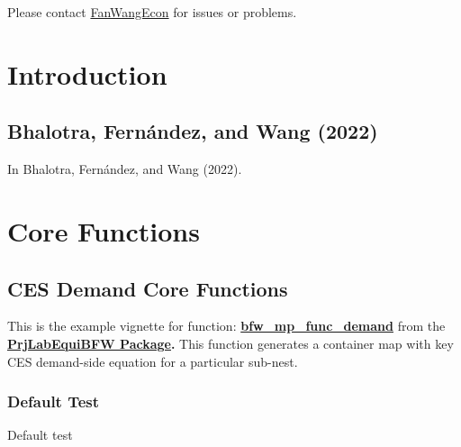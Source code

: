 \documentclass[
]{book}
\begin{document}
Please contact \href{https://fanwangecon.github.io/}{FanWangEcon} for issues or problems.

\hypertarget{introduction}{%
\chapter{Introduction}\label{introduction}}

\hypertarget{bhalotra-fernuxe1ndez-and-wang-2022}{%
\section{Bhalotra, Fernández, and Wang (2022)}\label{bhalotra-fernuxe1ndez-and-wang-2022}}

In Bhalotra, Fernández, and Wang (2022).

\hypertarget{core-functions}{%
\chapter{Core Functions}\label{core-functions}}

\hypertarget{ces-demand-core-functions}{%
\section{CES Demand Core Functions}\label{ces-demand-core-functions}}

This is the example vignette for function:
\href{https://github.com/FanWangEcon/PrjOptiSNW/tree/master/PrjLabEquiBFW/func/bfw_mp_func_demand.m}{\textbf{bfw\_mp\_func\_demand}}
from the \href{https://fanwangecon.github.io/PrjLabEquiBFW/}{\textbf{PrjLabEquiBFW
Package}}\textbf{.} This
function generates a container map with key CES demand-side equation for
a particular sub-nest.

\hypertarget{default-test}{%
\subsection{Default Test}\label{default-test}}

Default test
\end{document}
